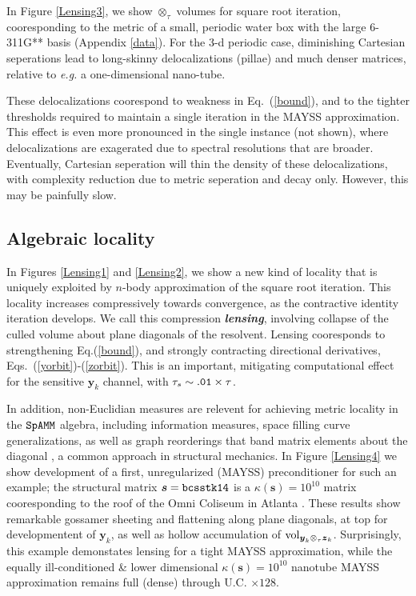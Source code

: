 \documentclass[letterpaper,twocolumn,amsmath,amsfont,amssymb,english,aps,jcp,preprintnumbers,groupaddress,nofootinbib,tightenlines,floatfix]{revtex4}
\newcommand{\mat}[1]{\boldsymbol{#1}}
\newcommand{\ot}{  {\scriptstyle \otimes}_{ \tau } }
\theoremstyle{plain}
\theoremstyle{remark}
\theoremstyle{plain}
\begin{document}

In Figure \ref{Lensing3}, we show $\ot$ volumes for square root iteration, cooresponding to the metric of a small, periodic water box 
with the large 6-311G** basis (Appendix \ref{data}).  
For the 3-d periodic case, diminishing Cartesian seperations lead to long-skinny delocalizations (pillae)
and much denser matrices, relative to {\em e.g.} a one-dimensional nano-tube.  

These delocalizations coorespond to weakness in Eq.~(\ref{bound}),  
and to the tighter thresholds required to maintain a single iteration in the MAYSS approximation.  This effect is even more pronounced in the 
single instance (not shown), where delocalizations are exagerated due to spectral resolutions that are broader.  
Eventually, Cartesian seperation will thin the density of these delocalizations,  
with complexity reduction due to metric seperation and decay only.  However, this may be painfully slow.  

\subsection{Algebraic locality}

In Figures \ref{Lensing1} and \ref{Lensing2},  we show a new kind of locality that is uniquely exploited by $n$-body approximation 
of the square root iteration.  This locality increases compressively towards convergence, 
as the contractive identity iteration develops.  
We call this compression {\bf  \em lensing},  involving collapse  of the culled volume about plane diagonals of the resolvent.
Lensing cooresponds to strengthening Eq.(\ref{bound}), 
and strongly contracting directional derivatives, Eqs.~(\ref{yorbit})-(\ref{zorbit}).
This is an important, mitigating computational effect for the sensitive $\mat{y}_k$ channel, 
with $\tau_s \sim {\tt .01} \times \tau$. 

In addition, non-Euclidian measures are relevent for achieving metric locality in 
the $\tt SpAMM$ algebra, including information measures, space filling curve generalizations, as well 
as graph reorderings that band matrix elements about the diagonal \cite{}, a common approach in 
structural mechanics.   In Figure \ref{Lensing4} we show development of a first, unregularized (MAYSS) 
preconditioner for such an example; the structural matrix $\mat{s}={\tt bcsstk14}$ is a $\kappa(\mat{s})=10^{10}$ matrix 
cooresponding to the roof of the Omni Coliseum in Atlanta \cite{}.  These results show remarkable 
gossamer sheeting and flattening along plane diagonals, at top for developmentent of $\mat{y}_k$, 
as well as hollow accumulation of ${\rm vol}_{\mat{y}_k \ot \mat{z}_k}$.
Surprisingly, this example demonstates lensing for a tight MAYSS approximation, while the 
equally ill-conditioned \& lower dimensional  $\kappa (\mat{s})=10^{10}$ nanotube MAYSS approximation 
remains full (dense) through U.C. $\times 128$.
\end{document}
